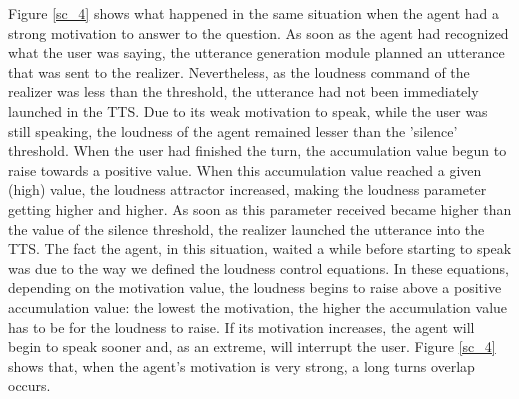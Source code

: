 Figure \ref{sc_4} shows what happened in the same situation when the agent had a strong motivation to answer to the question. %
As soon as the agent had recognized what the user was saying, the utterance generation module planned an utterance that was sent to the realizer. Nevertheless, as the loudness command of the realizer was less than the threshold, the utterance had  not been immediately launched in the TTS. 
Due to its weak motivation to speak, while the user was still speaking, the loudness of the agent remained lesser than the 'silence' threshold. When the user had finished the turn, the accumulation value begun to raise towards a positive value. When this accumulation value reached a given (high) value, the loudness attractor increased, making the loudness parameter getting higher and higher. As soon as this parameter received became higher than the value of the silence threshold, the realizer launched the utterance into the TTS.
The fact the agent, in this situation, waited a while before starting to speak was due to the way we defined the loudness control equations. In these equations, depending on the motivation value, the loudness begins to raise above a positive accumulation value: the lowest the motivation, the higher the accumulation value has to be for the loudness to raise. If its motivation increases, the agent will begin to speak sooner and, as an extreme, will interrupt the user. Figure \ref{sc_4} shows that, when the agent's motivation is very strong, a long turns overlap occurs. 
